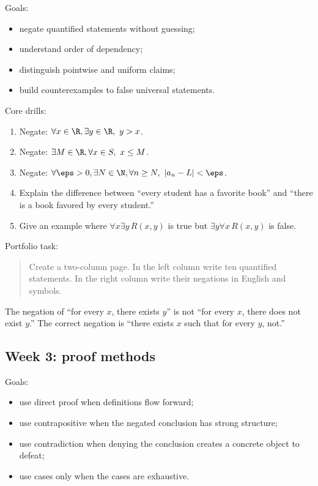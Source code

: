 Goals:

\begin{itemize}
\item negate quantified statements without guessing;
\item understand order of dependency;
\item distinguish pointwise and uniform claims;
\item build counterexamples to false universal statements.
\end{itemize}

Core drills:

\begin{enumerate}
\item Negate: $\forall x\in\R,\exists y\in\R,\ y>x$.
\item Negate: $\exists M\in\R,\forall x\in S,\ x\leq M$.
\item Negate: $\forall \eps>0,\exists N\in\N,\forall n\geq N,\ |a_n-L|<\eps$.
\item Explain the difference between ``every student has a favorite book'' and ``there is a book favored by every student.''
\item Give an example where $\forall x\exists y\,R(x,y)$ is true but $\exists y\forall x\,R(x,y)$ is false.
\end{enumerate}

Portfolio task:

\begin{quote}
Create a two-column page. In the left column write ten quantified statements. In the right column write their negations in English and symbols.
\end{quote}

\begin{trapbox}
The negation of ``for every $x$, there exists $y$'' is not ``for every $x$, there does not exist $y$.'' The correct negation is ``there exists $x$ such that for every $y$, not.''
\end{trapbox}

\subsection{Week 3: proof methods}

Goals:

\begin{itemize}
\item use direct proof when definitions flow forward;
\item use contrapositive when the negated conclusion has strong structure;
\item use contradiction when denying the conclusion creates a concrete object to defeat;
\item use cases only when the cases are exhaustive.
\end{itemize}


